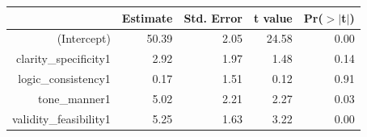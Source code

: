 \begin{tabular}{rrrrr}
  \toprule
 & Estimate & Std. Error & t value & Pr($>$$|$t$|$) \\ 
  \midrule
(Intercept) & 50.39 & 2.05 & 24.58 & 0.00 \\ 
  clarity\_specificity1 & 2.92 & 1.97 & 1.48 & 0.14 \\ 
  logic\_consistency1 & 0.17 & 1.51 & 0.12 & 0.91 \\ 
  tone\_manner1 & 5.02 & 2.21 & 2.27 & 0.03 \\ 
  validity\_feasibility1 & 5.25 & 1.63 & 3.22 & 0.00 \\ 
   \bottomrule
\end{tabular}
